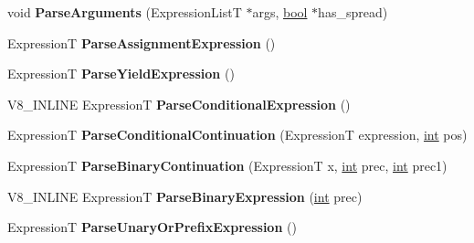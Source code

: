 \begin{DoxyCompactItemize}
\item 
\mbox{\label{classv8_1_1internal_1_1ParserBase_a0f192614eed0f929e4e5b8c8ec7b4e89}} 
void {\bfseries Parse\+Arguments} (Expression\+ListT $\ast$args, \mbox{\hyperlink{classbool}{bool}} $\ast$has\+\_\+spread)
\item 
\mbox{\label{classv8_1_1internal_1_1ParserBase_a07181050184a6efb94f27b285f710266}} 
ExpressionT {\bfseries Parse\+Assignment\+Expression} ()
\item 
\mbox{\label{classv8_1_1internal_1_1ParserBase_af75947fc55fe3b58f64b6e54ce28cafb}} 
ExpressionT {\bfseries Parse\+Yield\+Expression} ()
\item 
\mbox{\label{classv8_1_1internal_1_1ParserBase_a5924184bd189f4e1b8a6cfa03e2be753}} 
V8\+\_\+\+I\+N\+L\+I\+NE ExpressionT {\bfseries Parse\+Conditional\+Expression} ()
\item 
\mbox{\label{classv8_1_1internal_1_1ParserBase_a04b19e7d72d849e817a0089527dd2e11}} 
ExpressionT {\bfseries Parse\+Conditional\+Continuation} (ExpressionT expression, \mbox{\hyperlink{classint}{int}} pos)
\item 
\mbox{\label{classv8_1_1internal_1_1ParserBase_ac32684dfe025605fbb057f9ce6a68e85}} 
ExpressionT {\bfseries Parse\+Binary\+Continuation} (ExpressionT x, \mbox{\hyperlink{classint}{int}} prec, \mbox{\hyperlink{classint}{int}} prec1)
\item 
\mbox{\label{classv8_1_1internal_1_1ParserBase_a5224cada057f1f515fb73a2dd0365b85}} 
V8\+\_\+\+I\+N\+L\+I\+NE ExpressionT {\bfseries Parse\+Binary\+Expression} (\mbox{\hyperlink{classint}{int}} prec)
\item 
\mbox{\label{classv8_1_1internal_1_1ParserBase_a9f638ebff351b798dfa0b5c797743aab}} 
ExpressionT {\bfseries Parse\+Unary\+Or\+Prefix\+Expression} ()
\item 
\mbox{\label{classv8_1_1internal_1_1ParserBase_a2f7b0c297d42771ac3d5cd2f02d86e88}} 

\end{DoxyCompactItemize}
